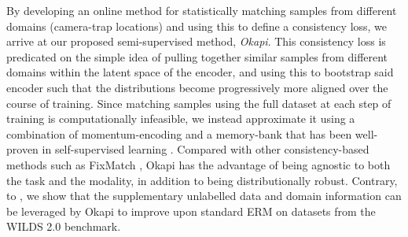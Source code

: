 By developing an online method for statistically matching samples from different domains
(camera-trap locations) and using this to define a consistency loss, we arrive at our proposed
semi-supervised method, \emph{Okapi}. 
%
This consistency loss is predicated on the simple idea of pulling together similar samples from
different domains within the latent space of the encoder, and using this to bootstrap said encoder
such that the distributions become progressively more aligned over the course of training. 
%
Since matching samples using the full dataset at each step of training is computationally
infeasible, we instead approximate it using a combination of momentum-encoding and a memory-bank
that has been well-proven in self-supervised learning \citep{he2020momentum, koohpayegani2021mean}.
%
Compared with other consistency-based methods such as FixMatch \citep{sohn2020fixmatch}, Okapi has
the advantage of being agnostic to both the task and the modality, in addition to being
distributionally robust.
%
Contrary, to \citet{SagWeiLeeGaoetal22}, we show that the supplementary unlabelled data and domain
information can be leveraged by Okapi to improve upon standard ERM on datasets from the WILDS 2.0
benchmark.
